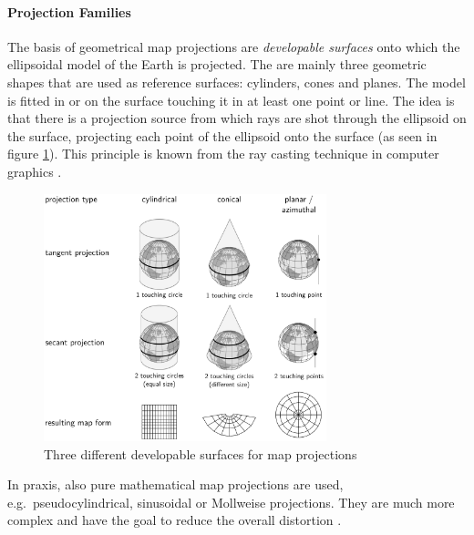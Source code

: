 \paragraph{Projection Families} %
\label{subp:projection_families}

The basis of geometrical map projections are \emph{developable surfaces} onto which the ellipsoidal model of the Earth is projected. The are mainly three geometric shapes that are used as reference surfaces: cylinders, cones and planes. The model is fitted in or on the surface touching it in at least one point or line. The idea is that there is a projection source from which rays are shot through the ellipsoid on the surface, projecting each point of the ellipsoid onto the surface (as seen in figure \ref{fig:projections}). This principle is known from the ray casting technique in computer graphics
\cite{mapProjectionGeokov}.

\begin{figure}[ht]
  \centering
  \includegraphics[width=0.73\textwidth]{graphics/basics/projections}
  \caption{Three different developable surfaces for map projections \protect\footnotemark}
  \label{fig:projections}
\end{figure}


In praxis, also pure mathematical map projections are used, e.g.\ pseudocylindrical, sinusoidal or Mollweise projections. They are much more complex and have the goal to reduce the overall distortion
\cite[p.99]{bolstad2008gis}.

